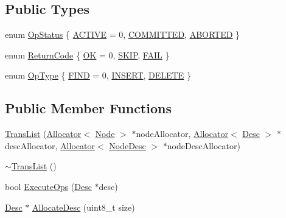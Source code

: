\subsection*{Public Types}
\begin{DoxyCompactItemize}
\item 
enum \hyperlink{classTransList_ad2f950383d1e3c092925b8da93cba077}{Op\-Status} \{ \hyperlink{classTransList_ad2f950383d1e3c092925b8da93cba077afd54079d85e81aa29eb670413495e5ac}{A\-C\-T\-I\-V\-E} = 0, 
\hyperlink{classTransList_ad2f950383d1e3c092925b8da93cba077a02613108c4abd45e07055594d900835f}{C\-O\-M\-M\-I\-T\-T\-E\-D}, 
\hyperlink{classTransList_ad2f950383d1e3c092925b8da93cba077afc37de87385a88580b88941e735278e6}{A\-B\-O\-R\-T\-E\-D}
 \}
\item 
enum \hyperlink{classTransList_a038a4c9ca7ab3f2fb94f6fa4b2ba267f}{Return\-Code} \{ \hyperlink{classTransList_a038a4c9ca7ab3f2fb94f6fa4b2ba267fa317cfad278eb247533acd032f55d9cd8}{O\-K} = 0, 
\hyperlink{classTransList_a038a4c9ca7ab3f2fb94f6fa4b2ba267fa975fb5c50fc8698e2f94666100980ca6}{S\-K\-I\-P}, 
\hyperlink{classTransList_a038a4c9ca7ab3f2fb94f6fa4b2ba267fa88f2ebae62bd2d7d5d3b095b9be58b09}{F\-A\-I\-L}
 \}
\item 
enum \hyperlink{classTransList_a5283c711063793711c7ef2da953d5563}{Op\-Type} \{ \hyperlink{classTransList_a5283c711063793711c7ef2da953d5563a493ff688d1c9bf3ad79b089889ad5446}{F\-I\-N\-D} = 0, 
\hyperlink{classTransList_a5283c711063793711c7ef2da953d5563ad8c4e073b0ed6184a1f6851f6694ed81}{I\-N\-S\-E\-R\-T}, 
\hyperlink{classTransList_a5283c711063793711c7ef2da953d5563ab64b085a8d67b89391120bd0a2f8f485}{D\-E\-L\-E\-T\-E}
 \}
\end{DoxyCompactItemize}
\subsection*{Public Member Functions}
\begin{DoxyCompactItemize}
\item 
\hyperlink{classTransList_afa3601be2aae71dfc71ba975594950c9}{Trans\-List} (\hyperlink{classAllocator}{Allocator}$<$ \hyperlink{structTransList_1_1Node}{Node} $>$ $\ast$node\-Allocator, \hyperlink{classAllocator}{Allocator}$<$ \hyperlink{structTransList_1_1Desc}{Desc} $>$ $\ast$desc\-Allocator, \hyperlink{classAllocator}{Allocator}$<$ \hyperlink{structTransList_1_1NodeDesc}{Node\-Desc} $>$ $\ast$node\-Desc\-Allocator)
\item 
\hyperlink{classTransList_ab2e6f219475f353257b70f9a0a7f0f2f}{$\sim$\-Trans\-List} ()
\item 
bool \hyperlink{classTransList_abe5853275ff6befa6ccd7ab0e84b4dce}{Execute\-Ops} (\hyperlink{structTransList_1_1Desc}{Desc} $\ast$desc)
\item 
\hyperlink{structTransList_1_1Desc}{Desc} $\ast$ \hyperlink{classTransList_a4a0093e3ba48a0b4914ec3d5f6817d77}{Allocate\-Desc} (uint8\-\_\-t size)
\end{DoxyCompactItemize}
